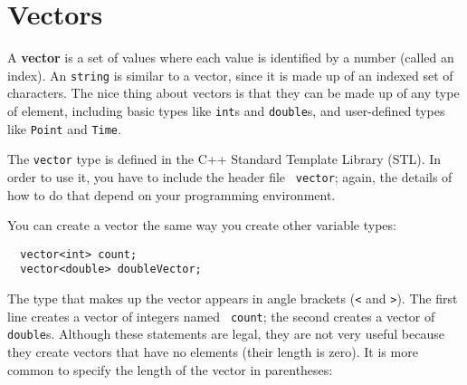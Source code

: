 




\chapter{Vectors}
\label{vectors}

A {\bf vector} is a set of values where each value is identified by a
number (called an index).  An {\tt string} is similar to a vector,
since it is made up of an indexed set of characters.  The nice thing
about vectors is that they can be made up of any type of element,
including basic types like {\tt int}s and {\tt double}s, 
and user-defined types like {\tt Point} and {\tt Time}.

The {\tt vector} type is defined in the C++ Standard Template Library (STL).
In order to use it, you have to include the header file {\tt
vector}; again, the details of how to do that depend on your
programming environment.

You can create a vector the same way you create other variable types:

\begin{verbatim}
  vector<int> count;
  vector<double> doubleVector;
\end{verbatim}
%
The type that makes up the vector appears in angle brackets ({\tt <}
and {\tt >}).  The first line creates a vector of integers named {\tt
count}; the second creates a vector of {\tt double}s.  Although these
statements are legal, they are not very useful because they create
vectors that have no elements (their length is zero).  It is more
common to specify the length of the vector in parentheses:

